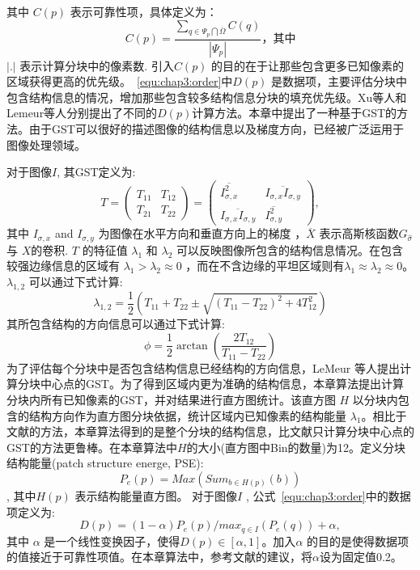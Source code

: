  其中 \(C(p)\) 表示可靠性项\cite{Criminisi04regionfilling}，具体定义为： $$C(p)=\frac{\sum_{q\in\Psi_p\bigcap\overline{\Omega}}{C(q)}}{\left\vert{\Psi_p}\right\vert}，其中$$\(\left\vert.\right\vert\)  表示计算分块中的像素数. 引入\(C(p)\) 的目的在于让那些包含更多已知像素的区域获得更高的优先级。~\ref{equ:chap3:order}中\(D(p)\) 是数据项，主要评估分块中包含结构信息的情况，增加那些包含较多结构信息分块的填充优先级。Xu等人\cite{Xu:2010}和Lemeur等人\cite{LeMeur_2011}分别提出了不同的\(D(p)\)计算方法。本章中提出了一种基于GST的方法。由于GST可以很好的描述图像的结构信息以及梯度方向，已经被广泛运用于图像处理领域\cite{Kothe03edgeand}。 \par
  对于图像\(I\), 其GST定义为:
  $$T=\left(\begin{array}{cc}T_{11} & T_{12} \\ T_{21} &T_{22}\end{array}\right)=\left(\begin{array}{cc}\overline{I_{\sigma,x}^2} & \overline{I_{\sigma,x}I_{\sigma,y}} \\ \overline{I_{\sigma,x}I_{\sigma,y}} & \overline{I_{\sigma,y}^2}\end{array}\right),$$
  其中 \(I_{\sigma,x}\) and \(I_{\sigma,y}\)  为图像在水平方向和垂直方向上的梯度 ，\(\overline{X}\) 表示高斯核函数\(G_{\hat{\sigma}}\) 与 \(X\)的卷积. \(T\) 的特征值 \(\lambda_1\) 和 \(\lambda_2\) 可以反映图像所包含的结构信息情况。在包含较强边缘信息的区域有 \(\lambda_1>\lambda_2\approx0\) ，而在不含边缘的平坦区域则有\(\lambda_1\approx\lambda_2\approx0\)。 \( \lambda_{1,2} \) 可以通过下式计算: $$\lambda_{1,2}=\frac{1}{2}\left(T_{11}+T_{22}\pm\sqrt{\left(T_{11}-T_{22}\right)^2+4T^2_{12}}\right)$$
  其所包含结构的方向信息可以通过下式计算:
 $$\phi=\frac{1}{2}\arctan{\left(\frac{2T_{12}}{T_{11}-T_{22}}\right)}$$
 为了评估每个分块中是否包含结构信息已经结构的方向信息，LeMeur
 等人\cite{LeMeur_2011}提出计算分块中心点的GST。为了得到区域内更为准确的结构信息，本章算法提出计算分块内所有已知像素的GST，并对结果进行直方图统计。该直方图 \(H\) 以分块内包含的结构方向作为直方图分块依据，统计区域内已知像素的结构能量 \(\lambda_1\)。相比于文献\cite{LeMeur_2011}的方法，本章算法得到的是整个分块的结构信息，比文献\cite{LeMeur_2011}只计算分块中心点的GST的方法更鲁棒。在本章算法中\(H\)的大小(直方图中Bin的数量)为12。定义分块结构能量(patch structure energe, PSE):
 $$P_e\left(p\right)=Max\left(Sum_{b\in{H\left(p\right)}}\left(b\right)\right)$$, 其中\(H\left(p\right)\) 表示结构能量直方图。 对于图像\(I\) , 公式~\ref{equ:chap3:order}中的数据项定义为:
 $$D(p)=(1-\alpha)P_e(p)/max_{q\in{I}}(P_e(q))+\alpha,$$ 其中 \(\alpha\) 是一个线性变换因子，使得\(D(p)\in{[\alpha,1]}\)。加入\(\alpha\) 的目的是使得数据项的值接近于可靠性项值。在本章算法中，参考文献\cite{Xu:2010}的建议，将\(\alpha\)设为固定值0.2。
